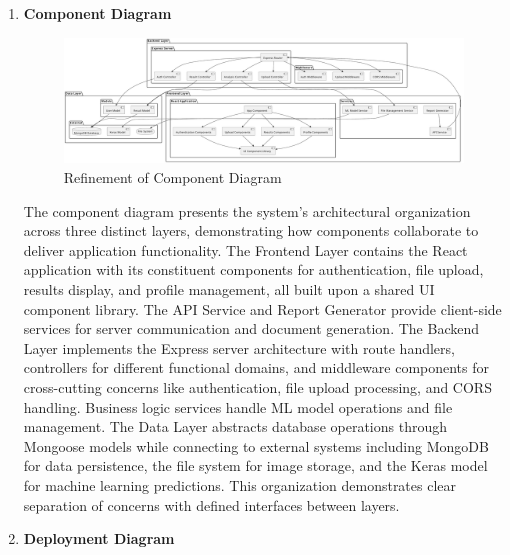 \begin{enumerate}[label=\roman*.]
    \item \textbf{Component Diagram}
          \begin{center}
              \begin{figure}[H]
                  \centering
                  \includegraphics[width=1\linewidth]{Images/Refined/component.pdf}
                  \caption{Refinement of Component Diagram}
                  \label{fig:RefinementofComponentDiagram}
              \end{figure}
          \end{center}
          The component diagram presents the system's architectural organization across three distinct layers, demonstrating how components collaborate to deliver application functionality. The Frontend Layer contains the React application with its constituent components for authentication, file upload, results display, and profile management, all built upon a shared UI component library. The API Service and Report Generator provide client-side services for server communication and document generation. The Backend Layer implements the Express server architecture with route handlers, controllers for different functional domains, and middleware components for cross-cutting concerns like authentication, file upload processing, and CORS handling. Business logic services handle ML model operations and file management. The Data Layer abstracts database operations through Mongoose models while connecting to external systems including MongoDB for data persistence, the file system for image storage, and the Keras model for machine learning predictions. This organization demonstrates clear separation of concerns with defined interfaces between layers.
          \newpage
    \item \textbf{Deployment Diagram}
          \begin{center}
              \begin{figure}[H]
                  \centering

\end{figure}
\end{center}
\end{enumerate}
